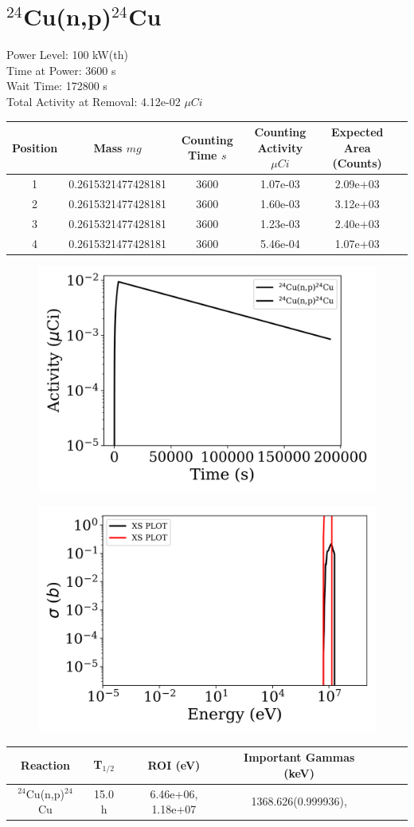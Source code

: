 \newpage

\section*{ $^{24}$Cu(n,p)$^{24}$Cu }

Power Level: 100 kW(th) \\
Time at Power: 3600 s \\
Wait Time: 172800 s \\
Total Activity at Removal: 4.12e-02 $\mu Ci$

\begin{table}[h]
\centering
\begin{tabular}{ |c|c|c|c|c|c| }
 \hline
 Position & Mass $mg$ & Counting Time $s$ & Counting Activity $\mu Ci$ & Expected Area (Counts) \\
 \hline 
 1 & 0.2615321477428181 & 3600 & 1.07e-03 & 2.09e+03\\ 
\hline
 2 & 0.2615321477428181 & 3600 & 1.60e-03 & 3.12e+03\\ 
\hline
 3 & 0.2615321477428181 & 3600 & 1.23e-03 & 2.40e+03\\ 
\hline
 4 & 0.2615321477428181 & 3600 & 5.46e-04 & 1.07e+03\\ 
\hline
\end{tabular}
\end{table}

\begin{figure}[!ht]
   \centering
   \includegraphics[width=.4\textwidth]{source/plot/Cu-24(n,p)Na-24_wisconsin1.png} 

\end{figure}

\begin{figure}[!ht]
   \centering
   \includegraphics[width=.4\textwidth]{source/plot/Cu-24(n,p)Na-24.png} 

\end{figure}

\begin{table}[h]
\centering
\begin{tabular}{ |c|c|c|c|c|c|c| }
 \hline
 Reaction & T$_{1/2}$ & ROI (eV) & Important Gammas (keV) \\
 \hline 
 $^{24}$Cu(n,p)$^{24}$Cu & 15.0 h & 6.46e+06, 1.18e+07 & 1368.626(0.999936),  \\ 
\hline
\end{tabular}
\end{table}
